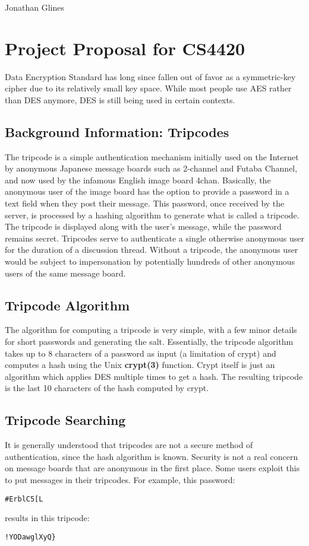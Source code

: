 \documentclass[12pt]{article}
\begin{document}
\begin{flushright}
{
\Large Jonathan Glines\\
}
\end{flushright}
\section*{Project Proposal for CS4420}
Data Encryption Standard has long since fallen out of favor as a symmetric-key cipher due to its relatively small key space. While most people use AES rather than DES anymore, DES is still being used in certain contexts.


\subsection*{Background Information: Tripcodes}
The tripcode is a simple authentication mechanism initially used on the Internet by anonymous Japanese message boards such as 2-channel and Futaba Channel, and now used by the infamous English image board 4chan. Basically, the anonymous user of the image board has the option to provide a password in a text field when they post their message. This password, once received by the server, is processed by a hashing algorithm to generate what is called a tripcode. The tripcode is displayed along with the user's message, while the password remains secret. Tripcodes serve to authenticate a single otherwise anonymous user for the duration of a discussion thread. Without a tripcode, the anonymous user would be subject to impersonation by potentially hundreds of other anonymous users of the same message board.


\subsection*{Tripcode Algorithm}
The algorithm for computing a tripcode is very simple, with a few minor details for short passwords and generating the salt. Essentially, the tripcode algorithm takes up to 8 characters of a password as input (a limitation of crypt) and computes a hash using the Unix {\bf crypt(3)} function. Crypt itself is just an algorithm which applies DES multiple times to get a hash. The resulting tripcode is the last 10 characters of the hash computed by crypt. 

\subsection*{Tripcode Searching}
It is generally understood that tripcodes are not a secure method of authentication, since the hash algorithm is known. Security is not a real concern on message boards that are anonymous in the first place. Some users exploit this to put messages in their tripcodes. For example, this password: \begin{verbatim}#ErblC5[L\end{verbatim} results in this tripcode: \begin{verbatim}!YODawglXyQ}\end{verbatim}
\end{document}
